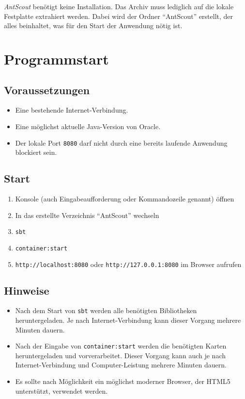 \documentclass[a4paper,10pt]{scrreprt}
\begin{document}
\textit{AntScout} benötigt keine Installation.
Das Archiv muss lediglich auf die lokale Festplatte extrahiert werden.
Dabei wird der Ordner ``AntScout'' erstellt, der alles beinhaltet, was für den Start der Anwendung nötig ist.

\section{Programmstart}
\label{sec:programmstart}

\subsection{Voraussetzungen}
\label{sec:voraussetzungen}

\begin{itemize}
  \item Eine bestehende Internet-Verbindung.
  \item Eine möglichst aktuelle Java-Version von Oracle.
  \item Der lokale Port \texttt{8080} darf nicht durch eine bereits laufende Anwendung blockiert sein.
\end{itemize}

\subsection{Start}
\label{sec:programmstart-start}

\begin{enumerate}
  \item Konsole (auch Eingabeaufforderung oder Kommandozeile genannt) öffnen
  \item In das erstellte Verzeichnis ``AntScout'' wechseln
  \item \texttt{sbt}
  \item \texttt{container:start}
  \item \texttt{http://localhost:8080} oder \texttt{http://127.0.0.1:8080} im Browser aufrufen
\end{enumerate}

\subsection{Hinweise}
\label{sec:programmstart-hinweise}

\begin{itemize}
  \item Nach dem Start von \texttt{sbt} werden alle benötigten Bibliotheken heruntergeladen.
    Je nach Internet-Verbindung kann dieser Vorgang mehrere Minuten dauern.
  \item Nach der Eingabe von \texttt{container:start} werden die benötigten Karten heruntergeladen und vorverarbeitet.
    Dieser Vorgang kann auch je nach Internet-Verbindung und Computer-Leistung mehrere Minuten dauern.
  \item Es sollte nach Möglichkeit ein möglichst moderner Browser, der HTML5 unterstützt, verwendet werden.
\end{itemize}
\end{document}

